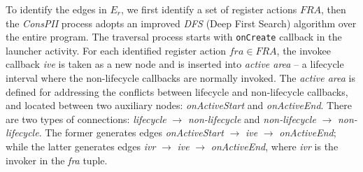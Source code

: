 To identify the edges in $E_r$, we first identify a set of register actions $\mathit{FRA}$, then the \textit{ConsPII} process adopts an improved \textit{DFS} (Deep First Search) algorithm over the entire program. The traversal process starts with \texttt{onCreate} callback in the launcher activity. For each identified register action $\mathit{fra}\in \mathit{FRA}$, the invokee callback \textit{ive} is taken as a new node and is inserted into \textit{active area} -- a lifecycle interval where the non-lifecycle callbacks are normally invoked. The \textit{active area} is defined for addressing the conflicts between lifecycle and non-lifecycle callbacks, and located between two auxiliary nodes: \textit{onActiveStart} and \textit{onActiveEnd}. There are two types of connections: \textit{lifecycle} $\rightarrow $ \textit{non-lifecycle} and \textit{non-lifecycle} $\rightarrow $ \textit{non-lifecycle}. The former generates edges \textit{onActiveStart} $\rightarrow $ \textit{ive} $\rightarrow $ \textit{onActiveEnd}; while the latter generates edges \textit{ivr} $\rightarrow $ \textit{ive} $\rightarrow $ \textit{onActiveEnd}, where \textit{ivr} is the invoker in the \textit{fra} tuple. %


